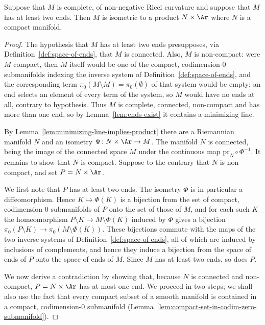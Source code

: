 \begin{theorem}
\label{thm:splitting-theorem}
\label{splitting}
Suppose that $M$ is complete, of non-negative Ricci curvature and suppose
that $M$ has at least two ends. Then $M$ is isometric to a product
$N\times \Ar$ where $N$ is a compact manifold.
\end{theorem}

\begin{proof}
The hypothesis that $M$ has at least two ends presupposes, via
Definition~\ref{def:space-of-ends}, that $M$ is connected. Also, $M$ is
non-compact: were $M$ compact, then $M$ itself would be one of the
compact, codimension-$0$ submanifolds indexing the inverse system of
Definition~\ref{def:space-of-ends}, and the corresponding term
$\pi_0(M\setminus M)=\pi_0(\emptyset)$ of that system would be empty; an
end selects an element of every term of the system, so $M$ would have no
ends at all, contrary to hypothesis. Thus $M$ is complete, connected,
non-compact and has more than one end, so by Lemma~\ref{lem:ends-exist}
it contains a minimizing line.

By Lemma~\ref{lem:minimizing-line-implies-product} there are a Riemannian
manifold $N$ and an isometry $\Phi\colon N\times\Ar\to M$. The manifold
$N$ is connected, being the image of the connected space $M$ under the
continuous map $\mathrm{pr}_N\circ\Phi^{-1}$. It remains to show that $N$
is compact. Suppose to the contrary that $N$ is non-compact, and set
$P=N\times\Ar$.

We first note that $P$ has at least two ends. The isometry $\Phi$ is in
particular a diffeomorphism. Hence $K\mapsto\Phi(K)$ is a bijection from
the set of compact, codimension-$0$ submanifolds of $P$ onto the set of
those of $M$, and for each such $K$ the homeomorphism
$P\setminus K\to M\setminus\Phi(K)$ induced by $\Phi$ gives a bijection
$\pi_0(P\setminus K)\to\pi_0(M\setminus\Phi(K))$. These bijections commute
with the maps of the two inverse systems of
Definition~\ref{def:space-of-ends}, all of which are induced by inclusions
of complements, and hence they induce a bijection from the space of ends
of $P$ onto the space of ends of $M$. Since $M$ has at least two ends, so
does $P$.

We now derive a contradiction by showing that, because $N$ is connected
and non-compact, $P=N\times\Ar$ has at most one end. We proceed in two
steps; we shall also use the fact that every compact subset of a smooth
manifold is contained in a compact, codimension-$0$ submanifold
(Lemma~\ref{lem:compact-set-in-codim-zero-submanifold}).


\end{proof}
